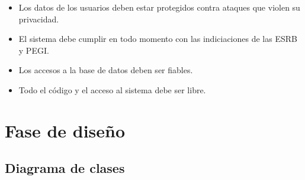 \begin{itemize}
	\item
		Los datos de los usuarios deben estar protegidos contra ataques que violen su privacidad.
	\item
		El sistema debe cumplir en todo momento con las indiciaciones de las ESRB y PEGI\@.
	\item
		Los accesos a la base de datos deben ser fiables.
	\item
		Todo el código y el acceso al sistema debe ser libre.
\end{itemize}

\section{Fase de diseño}

\subsection{Diagrama de clases}

